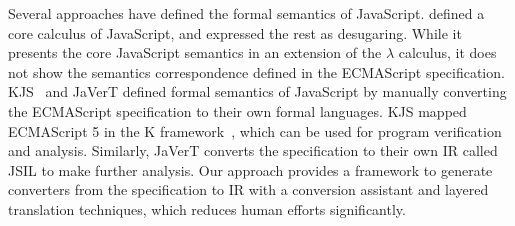 Several approaches have defined the formal semantics of JavaScript.
\citet{lambdajs} defined a core calculus of JavaScript, and expressed the
rest as desugaring.  While it presents the core JavaScript semantics in
an extension of the $\lambda$ calculus, it does not show the semantics
correspondence defined in the ECMAScript specification.  KJS~\citet{kjs} and
JaVerT\citet{javert} defined formal semantics of JavaScript by manually converting
the ECMAScript specification to their own formal languages.  KJS mapped
ECMAScript 5 in the K framework~\cite{kframework}, which can be used
for program verification and analysis.  Similarly, JaVerT converts the
specification to their own IR called JSIL to make further analysis.
Our approach provides a framework to generate converters from the
specification to IR with a conversion assistant and layered translation
techniques, which reduces human efforts significantly.

